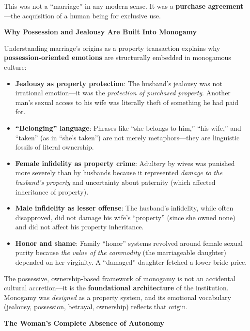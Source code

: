 \documentclass[12pt,openany]{book}
\numberwithin{equation}{chapter}
\begin{document}
This was not a ``marriage'' in any modern sense. It was a \textbf{purchase agreement}---the acquisition of a human being for exclusive use.

\textbf{Why Possession and Jealousy Are Built Into Monogamy}

Understanding marriage's origins as a property transaction explains why \textbf{possession-oriented emotions} are structurally embedded in monogamous culture:

\begin{itemize}
    \item \textbf{Jealousy as property protection}: The husband's jealousy was not irrational emotion---it was the \textit{protection of purchased property}. Another man's sexual access to his wife was literally theft of something he had paid for.
    
    \item \textbf{``Belonging'' language}: Phrases like ``she belongs to him,'' ``his wife,'' and ``taken'' (as in ``she's taken'') are not merely metaphors---they are linguistic fossils of literal ownership.
    
    \item \textbf{Female infidelity as property crime}: Adultery by wives was punished more severely than by husbands because it represented \textit{damage to the husband's property} and uncertainty about paternity (which affected inheritance of property).
    
    \item \textbf{Male infidelity as lesser offense}: The husband's infidelity, while often disapproved, did not damage his wife's ``property'' (since she owned none) and did not affect his property inheritance.
    
    \item \textbf{Honor and shame}: Family ``honor'' systems revolved around female sexual purity because \textit{the value of the commodity} (the marriageable daughter) depended on her virginity. A ``damaged'' daughter fetched a lower bride price.
\end{itemize}

The possessive, ownership-based framework of monogamy is not an accidental cultural accretion---it is the \textbf{foundational architecture} of the institution. Monogamy was \textit{designed} as a property system, and its emotional vocabulary (jealousy, possession, betrayal, ownership) reflects that origin.

\textbf{The Woman's Complete Absence of Autonomy}
\end{document}
